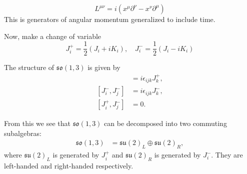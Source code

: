\begin{example}
    \begin{equation}
        L^{\mu \nu} = i \left( x^\mu \partial^\nu - x^\nu \partial^\mu \right)
    \end{equation}
    This is generators of angular momentum generalized to include time.
\end{example}

Now, make a change of variable
\begin{equation}
    J_i^+ = \frac{1}{2} (J_i + i K_i), \quad J_i^- = \frac{1}{2} (J_i - i K_i)
\end{equation}

The structure of $\mathfrak{so}(1,3)$ is given by
\begin{align*}
    [J_i^+, J_j^+] &= i \epsilon_{ijk} J_k^+, \\
    [J_i^-, J_j^-] &= i \epsilon_{ijk} J_k^-, \\
    [J_i^+, J_j^-] &= 0.
\end{align*}

From this we see that $\mathfrak{so}(1,3)$ can be decomposed into two commuting subalgebras:
\begin{align*}
    \mathfrak{so}(1,3) &= \mathfrak{su}(2)_L \oplus \mathfrak{su}(2)_R,
\end{align*}
where $\mathfrak{su}(2)_L$ is generated by $J_i^+$ and $\mathfrak{su}(2)_R$ is generated by $J_i^-$. They are left-handed and right-handed respectively.

